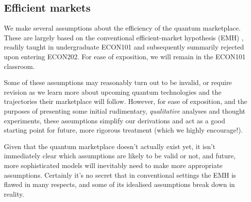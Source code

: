 \subsection{Efficient markets}\label{sec:eff_markets} 

\newline

We make several assumptions about the efficiency of the quantum marketplace. These are largely based on the conventional efficient-market hypothesis (EMH) \cite{???}, readily taught in undergraduate ECON101 and subsequently summarily rejected upon entering ECON202. For ease of exposition, we will remain in the ECON101 classroom.

Some of these assumptions may reasonably turn out to be invalid, or require revision as we learn more about upcoming quantum technologies and the trajectories their marketplace will follow. However, for ease of exposition, and the purposes of presenting some initial rudimentary, \textit{qualitative} analyses and thought experiments, these assumptions simplify our derivations and act as a good starting point for future, more rigorous treatment (which we highly encourage!).

Given that the quantum marketplace doesn't actually exist yet, it isn't immediately clear which assumptions are likely to be valid or not, and future, more sophisticated models will inevitably need to make more appropriate assumptions. Certainly it's no secret that in conventional settings the EMH is flawed in many respects, and some of its idealised assumptions break down in reality.


